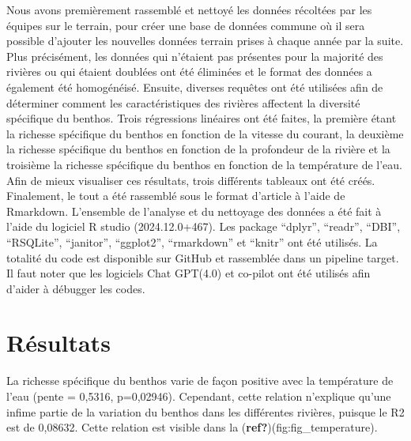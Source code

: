 \documentclass[9pt,twocolumn,twoside,]{pnas-new}
\begin{document}
Nous avons premièrement rassemblé et nettoyé les données récoltées par
les équipes sur le terrain, pour créer une base de données commune où il
sera possible d'ajouter les nouvelles données terrain prises à chaque
année par la suite. Plus précisément, les données qui n'étaient pas
présentes pour la majorité des rivières ou qui étaient doublées ont été
éliminées et le format des données a également été homogénéisé. Ensuite,
diverses requêtes ont été utilisées afin de déterminer comment les
caractéristiques des rivières affectent la diversité spécifique du
benthos. Trois régressions linéaires ont été faites, la première étant
la richesse spécifique du benthos en fonction de la vitesse du courant,
la deuxième la richesse spécifique du benthos en fonction de la
profondeur de la rivière et la troisième la richesse spécifique du
benthos en fonction de la température de l'eau. Afin de mieux visualiser
ces résultats, trois différents tableaux ont été créés. Finalement, le
tout a été rassemblé sous le format d'article à l'aide de Rmarkdown.
L'ensemble de l'analyse et du nettoyage des données a été fait à l'aide
du logiciel R studio (2024.12.0+467). Les package ``dplyr'', ``readr'',
``DBI'', ``RSQLite'', ``janitor'', ``ggplot2'', ``rmarkdown'' et
``knitr'' ont été utilisés. La totalité du code est disponible sur
GitHub et rassemblée dans un pipeline target. Il faut noter que les
logiciels Chat GPT(4.0) et co-pilot ont été utilisés afin d'aider à
débugger les codes.

\section{Résultats}\label{ruxe9sultats}

La richesse spécifique du benthos varie de façon positive avec la
température de l'eau (pente = 0,5316, p=0,02946). Cependant, cette
relation n'explique qu'une infime partie de la variation du benthos dans
les différentes rivières, puisque le R2 est de 0,08632. Cette relation
est visible dans la (\textbf{ref?})(fig:fig\_temperature).
\end{document}
